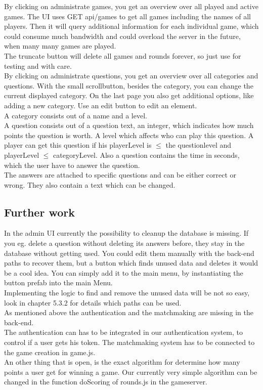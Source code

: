 By clicking on administrate games, you get an overview over all played and active games. The UI uses GET api/games to get all games including the names of all players. Then it will query additional information for each individual game, which could consume much bandwidth and could overload the server in the future, when many many games are played.\\
The truncate button will delete all games and rounds forever, so just use for testing and with care.\\

By clicking on administrate questions, you get an overview over all categories and questions. With the small scrollbutton, besides the category, you can change the current displayed category. On the last page you also get additional options, like adding a new category. Use an edit button to edit an element.\\
A category consists out of a name and a level.\\
A question consists out of a question text, an integer, which indicates how much points the question is worth. A level which affects who can play this question. A player can get this question if his playerLevel is $\leq$ the questionlevel and playerLevel $\leq$ categoryLevel. Also a question contains the time in seconds, which the user have to answer the question.\\
The answers are attached to specific questions and can be either correct or wrong. They also contain a text which can be changed.

\subsection{Further work}
In the admin UI currently the possibility to cleanup the database is missing. If you eg. delete a question without deleting its answers before, they stay in the database without getting used. You could edit them manually with the back-end paths to recover them, but a button which finds unused data and deletes it would be a cool idea. You can simply add it to the main menu, by instantiating the button prefab into the main Menu.\\
Implementing the logic to find and remove the unused data will be not so easy, look in chapter 5.3.2 for details which paths can be used.\\

As mentioned above the authentication and the matchmaking are missing in the back-end.\\
The authentication can has to be integrated in our authentication system, to control if a user gets his token. The matchmaking system has to be connected to the game creation in game.js.\\

An other thing that is open, is the exact algorithm for determine how many points a user get for winning a game. Our currently very simple algorithm can be changed in the function doScoring of rounds.js in the gameserver.